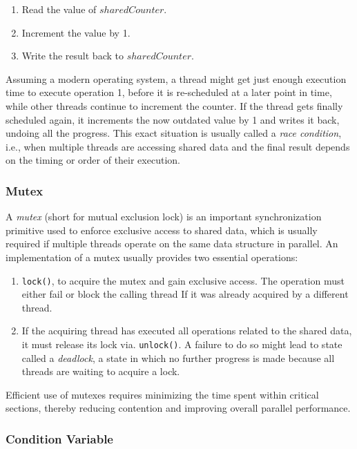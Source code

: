 		\begin{enumerate}
			\item Read the value of $sharedCounter$.
			\item Increment the value by 1.
			\item Write the result back to $sharedCounter$.
		\end{enumerate}

		Assuming a modern operating system, a thread might get just enough execution time to execute operation 1, before it is re-scheduled at a later point in time, while other threads continue to increment the counter.
		If the thread gets finally scheduled again, it increments the now outdated value by 1 and writes it back, undoing all the progress.
		This exact situation is usually called a \textit{race condition}, i.e., when multiple threads are accessing shared data and the final result depends on the timing or order of their execution.

		\clearpage

		\subsubsection{Mutex}

			A \textit{mutex} (short for mutual exclusion lock) is an important synchronization primitive used to enforce exclusive access to shared data, which is usually required if multiple threads operate on the same data structure in parallel.
			An implementation of a mutex usually provides two essential operations:

			\begin{enumerate}
				\item \lstinline|lock()|, to acquire the mutex and gain exclusive access. The operation must either fail or block the calling thread If it was already acquired by a different thread.
				\item If the acquiring thread has executed all operations related to the shared data, it must release its lock via. \lstinline|unlock()|. A failure to do so might lead to state called a \textit{deadlock}, a state in which no further progress is made because all threads are waiting to acquire a lock.
			\end{enumerate}

			Efficient use of mutexes requires minimizing the time spent within critical sections, thereby reducing contention and improving overall parallel performance.

		\subsubsection{Condition Variable}

